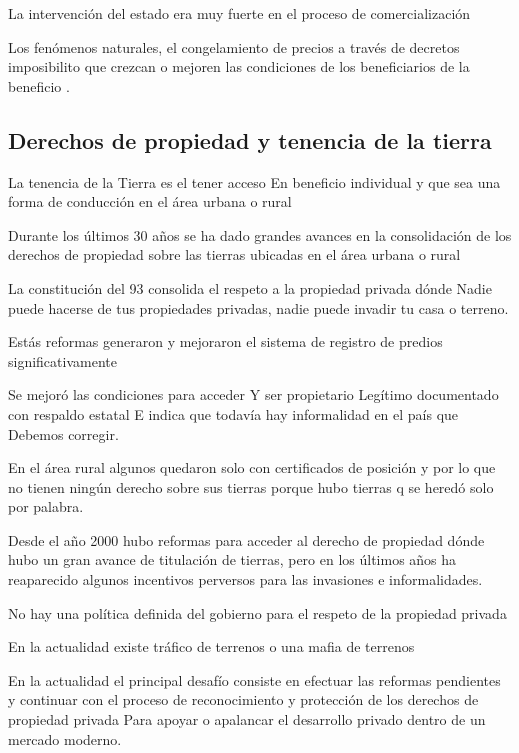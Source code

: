 \documentclass[
  letterpaper,
  DIV=11,
  numbers=noendperiod]{scrartcl}
\begin{document}
La intervención del estado era muy fuerte en el proceso de
comercialización

Los fenómenos naturales, el congelamiento de precios a través de
decretos imposibilito que crezcan o mejoren las condiciones de los
beneficiarios de la beneficio .

\hypertarget{derechos-de-propiedad-y-tenencia-de-la-tierra}{%
\subsection{Derechos de propiedad y tenencia de la
tierra}\label{derechos-de-propiedad-y-tenencia-de-la-tierra}}

La tenencia de la Tierra es el tener acceso En beneficio individual y
que sea una forma de conducción en el área urbana o rural

Durante los últimos 30 años se ha dado grandes avances en la
consolidación de los derechos de propiedad sobre las tierras ubicadas en
el área urbana o rural

La constitución del 93 consolida el respeto a la propiedad privada dónde
Nadie puede hacerse de tus propiedades privadas, nadie puede invadir tu
casa o terreno.

Estás reformas generaron y mejoraron el sistema de registro de predios
significativamente

Se mejoró las condiciones para acceder Y ser propietario Legítimo
documentado con respaldo estatal E indica que todavía hay informalidad
en el país que Debemos corregir.

En el área rural algunos quedaron solo con certificados de posición y
por lo que no tienen ningún derecho sobre sus tierras porque hubo
tierras q se heredó solo por palabra.

Desde el año 2000 hubo reformas para acceder al derecho de propiedad
dónde hubo un gran avance de titulación de tierras, pero en los últimos
años ha reaparecido algunos incentivos perversos para las invasiones e
informalidades.

No hay una política definida del gobierno para el respeto de la
propiedad privada

En la actualidad existe tráfico de terrenos o una mafia de terrenos

En la actualidad el principal desafío consiste en efectuar las reformas
pendientes y continuar con el proceso de reconocimiento y protección de
los derechos de propiedad privada Para apoyar o apalancar el desarrollo
privado dentro de un mercado moderno.
\end{document}
